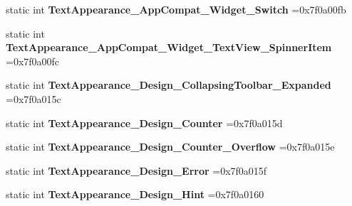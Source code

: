 \begin{DoxyCompactItemize}
\item 
\mbox{\label{classandroid_1_1support_1_1v7_1_1mediarouter_1_1R_1_1style_ac7a3457f03643d782aa1d0edb1082ff9}} 
static int {\bfseries Text\+Appearance\+\_\+\+App\+Compat\+\_\+\+Widget\+\_\+\+Switch} =0x7f0a00fb
\item 
\mbox{\label{classandroid_1_1support_1_1v7_1_1mediarouter_1_1R_1_1style_a4d32bc8ec42a95608e3a71bcc4fb644e}} 
static int {\bfseries Text\+Appearance\+\_\+\+App\+Compat\+\_\+\+Widget\+\_\+\+Text\+View\+\_\+\+Spinner\+Item} =0x7f0a00fc
\item 
\mbox{\label{classandroid_1_1support_1_1v7_1_1mediarouter_1_1R_1_1style_a6512087f7e6ec968b84e526ba206c3e5}} 
static int {\bfseries Text\+Appearance\+\_\+\+Design\+\_\+\+Collapsing\+Toolbar\+\_\+\+Expanded} =0x7f0a015c
\item 
\mbox{\label{classandroid_1_1support_1_1v7_1_1mediarouter_1_1R_1_1style_a65445c2cb7fe38923715ada0e2909c92}} 
static int {\bfseries Text\+Appearance\+\_\+\+Design\+\_\+\+Counter} =0x7f0a015d
\item 
\mbox{\label{classandroid_1_1support_1_1v7_1_1mediarouter_1_1R_1_1style_a055a2e438c6e29a6ee77383bc3901135}} 
static int {\bfseries Text\+Appearance\+\_\+\+Design\+\_\+\+Counter\+\_\+\+Overflow} =0x7f0a015e
\item 
\mbox{\label{classandroid_1_1support_1_1v7_1_1mediarouter_1_1R_1_1style_ae2ad2afc594aeda540ca45c04ac2fe6b}} 
static int {\bfseries Text\+Appearance\+\_\+\+Design\+\_\+\+Error} =0x7f0a015f
\item 
\mbox{\label{classandroid_1_1support_1_1v7_1_1mediarouter_1_1R_1_1style_aa0bfb606b5ee282e8a62cb23febee589}} 
static int {\bfseries Text\+Appearance\+\_\+\+Design\+\_\+\+Hint} =0x7f0a0160
\item 
\mbox{\label{classandroid_1_1support_1_1v7_1_1mediarouter_1_1R_1_1style_aa0ad1d61d41a6b390dec74c0abb5b410}} 

\end{DoxyCompactItemize}
